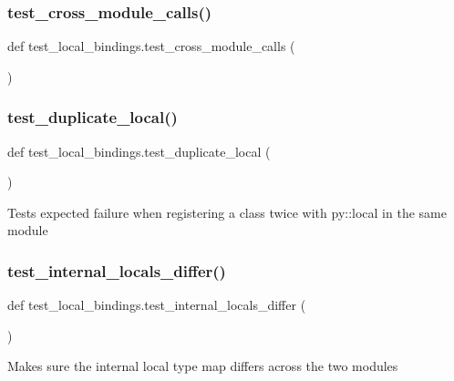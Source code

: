 \subsubsection{\texorpdfstring{test\_cross\_module\_calls()}{test\_cross\_module\_calls()}}
{\footnotesize\ttfamily def test\+\_\+local\+\_\+bindings.\+test\+\_\+cross\+\_\+module\+\_\+calls (\begin{DoxyParamCaption}{ }\end{DoxyParamCaption})}

\mbox{\label{namespacetest__local__bindings_a641060e93ec6852ee97d786e47fc78e9}} 
\subsubsection{\texorpdfstring{test\_duplicate\_local()}{test\_duplicate\_local()}}
{\footnotesize\ttfamily def test\+\_\+local\+\_\+bindings.\+test\+\_\+duplicate\+\_\+local (\begin{DoxyParamCaption}{ }\end{DoxyParamCaption})}

\begin{DoxyVerb}Tests expected failure when registering a class twice with py::local in the same module\end{DoxyVerb}
 \mbox{\label{namespacetest__local__bindings_a07fe6fdd4ccaa3697563f193a9b0fcd1}} 
\subsubsection{\texorpdfstring{test\_internal\_locals\_differ()}{test\_internal\_locals\_differ()}}
{\footnotesize\ttfamily def test\+\_\+local\+\_\+bindings.\+test\+\_\+internal\+\_\+locals\+\_\+differ (\begin{DoxyParamCaption}{ }\end{DoxyParamCaption})}

\begin{DoxyVerb}Makes sure the internal local type map differs across the two modules\end{DoxyVerb}
 \mbox{\label{namespacetest__local__bindings_a74879937e35258fb5bb64e0c54123958}} 
